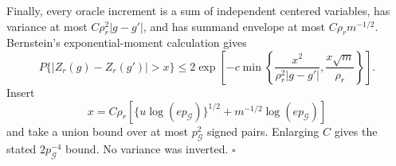 Finally, every oracle increment is a sum of independent centered variables, has variance at most \(C\rho_r^2|g-g'|\), and has summand envelope at most \(C\rho_rm^{-1/2}\).  Bernstein's exponential-moment calculation gives
\[
 P\{|Z_r(g)-Z_r(g')|>x\}
 \le2\exp\left[-c\min\left\{
 \frac{x^2}{\rho_r^2|g-g'|},
 \frac{x\sqrt m}{\rho_r}\right\}\right].             \tag{16}
\]
Insert
\[
 x=C\rho_r\left[\{u\log(ep_{\mathcal G})\}^{1/2}
 +m^{-1/2}\log(ep_{\mathcal G})\right]
\]
and take a union bound over at most \(p_{\mathcal G}^2\) signed pairs.  Enlarging \(C\) gives the stated \(2p_{\mathcal G}^{-4}\) bound.  No variance was inverted. \(\square\)